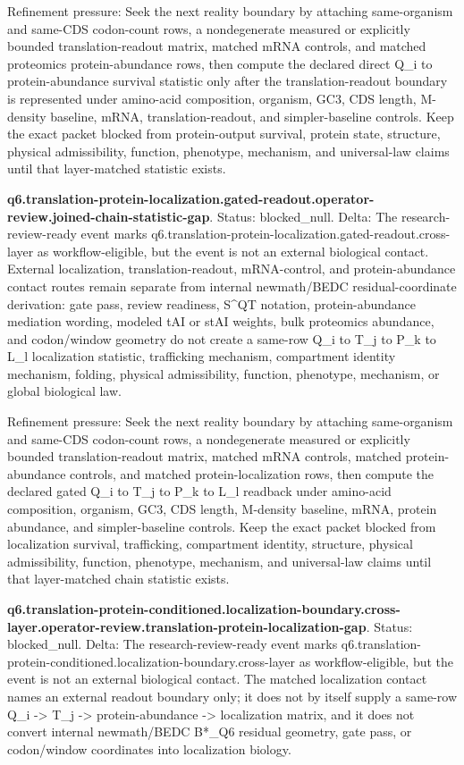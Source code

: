 Refinement pressure: Seek the next reality boundary by attaching same-organism and same-CDS codon-count rows, a nondegenerate measured or explicitly bounded translation-readout matrix, matched mRNA controls, and matched proteomics protein-abundance rows, then compute the declared direct Q\_i to protein-abundance survival statistic only after the translation-readout boundary is represented under amino-acid composition, organism, GC3, CDS length, M-density baseline, mRNA, translation-readout, and simpler-baseline controls. Keep the exact packet blocked from protein-output survival, protein state, structure, physical admissibility, function, phenotype, mechanism, and universal-law claims until that layer-matched statistic exists.

\textbf{q6.translation-protein-localization.gated-readout.operator-review.joined-chain-statistic-gap}. Status: blocked\_null. Delta: The research-review-ready event marks q6.translation-protein-localization.gated-readout.cross-layer as workflow-eligible, but the event is not an external biological contact. External localization, translation-readout, mRNA-control, and protein-abundance contact routes remain separate from internal newmath/BEDC residual-coordinate derivation: gate pass, review readiness, S\textasciicircum{}QT notation, protein-abundance mediation wording, modeled tAI or stAI weights, bulk proteomics abundance, and codon/window geometry do not create a same-row Q\_i to T\_j to P\_k to L\_l localization statistic, trafficking mechanism, compartment identity mechanism, folding, physical admissibility, function, phenotype, mechanism, or global biological law.

Refinement pressure: Seek the next reality boundary by attaching same-organism and same-CDS codon-count rows, a nondegenerate measured or explicitly bounded translation-readout matrix, matched mRNA controls, matched protein-abundance controls, and matched protein-localization rows, then compute the declared gated Q\_i to T\_j to P\_k to L\_l readback under amino-acid composition, organism, GC3, CDS length, M-density baseline, mRNA, protein abundance, and simpler-baseline controls. Keep the exact packet blocked from localization survival, trafficking, compartment identity, structure, physical admissibility, function, phenotype, mechanism, and universal-law claims until that layer-matched chain statistic exists.

\textbf{q6.translation-protein-conditioned.localization-boundary.cross-layer.operator-review.translation-protein-localization-gap}. Status: blocked\_null. Delta: The research-review-ready event marks q6.translation-protein-conditioned.localization-boundary.cross-layer as workflow-eligible, but the event is not an external biological contact. The matched localization contact names an external readout boundary only; it does not by itself supply a same-row Q\_i -> T\_j -> protein-abundance -> localization matrix, and it does not convert internal newmath/BEDC B*\_Q6 residual geometry, gate pass, or codon/window coordinates into localization biology.


